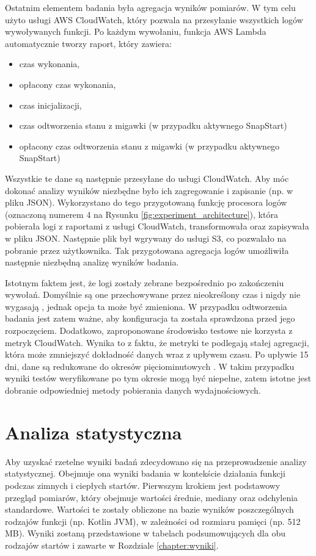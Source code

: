 Ostatnim elementem badania była agregacja wyników pomiarów.
W tym celu użyto usługi AWS CloudWatch, który pozwala na przesyłanie wszystkich logów wywoływanych funkcji.
Po każdym wywołaniu, funkcja AWS Lambda automatycznie tworzy raport, który zawiera:
\begin{itemize}
    \item czas wykonania,
    \item opłacony czas wykonania,
    \item czas inicjalizacji,
    \item czas odtworzenia stanu z migawki (w przypadku aktywnego SnapStart)
    \item opłacony czas odtworzenia stanu z migawki (w przypadku aktywnego SnapStart)
\end{itemize}
Wszystkie te dane są następnie przesyłane do usługi CloudWatch. 
Aby móc dokonać analizy wyników niezbędne było ich zagregowanie i zapisanie (np. w pliku JSON).
Wykorzystano do tego przygotowaną funkcję procesora logów (oznaczoną numerem 4 na Rysunku \ref{fig:experiment_architecture}), która pobierała logi z raportami z usługi CloudWatch, transformowała oraz zapisywała w pliku JSON.
Następnie plik był wgrywany do usługi S3, co pozwalało na pobranie przez użytkownika.
Tak przygotowana agregacja logów umożliwiła następnie niezbędną analizę wyników badania.

Istotnym faktem jest, że logi zostały zebrane bezpośrednio po zakończeniu wywołań.
Domyślnie są one przechowywane przez nieokreślony czas i nigdy nie wygasają \cite{AWSCloudWatchLogs}, jednak opcja ta może być zmieniona.
W przypadku odtworzenia badania jest zatem ważne, aby konfiguracja ta została sprawdzona przed jego rozpoczęciem.
Dodatkowo, zaproponowane środowisko testowe nie korzysta z metryk CloudWatch.
Wynika to z faktu, że metryki te podlegają stałej agregacji, która może zmniejszyć dokładność danych wraz z upływem czasu.
Po upływie 15 dni, dane są redukowane do okresów pięciominutowych \cite{AWSCloudWatchLogs}.
W takim przypadku wyniki testów weryfikowane po tym okresie mogą być niepełne, zatem istotne jest dobranie odpowiedniej metody pobierania danych wydajnościowych.

\section{Analiza statystyczna}\label{chapter:analiza_statystyczna}

Aby uzyskać rzetelne wyniki badań zdecydowano się na przeprowadzenie analizy statystycznej.
Obejmuje ona wyniki badania w kontekście działania funkcji podczas zimnych i ciepłych startów.
Pierwszym krokiem jest podstawowy przegląd pomiarów, który obejmuje wartości średnie, mediany oraz odchylenia standardowe.
Wartości te zostały obliczone na bazie wyników poszczególnych rodzajów funkcji (np. Kotlin JVM), w zależności od rozmiaru pamięci (np. 512 MB).
Wyniki zostaną przedstawione w tabelach podsumowujących dla obu rodzajów startów i zawarte w Rozdziale \ref{chapter:wyniki}.

